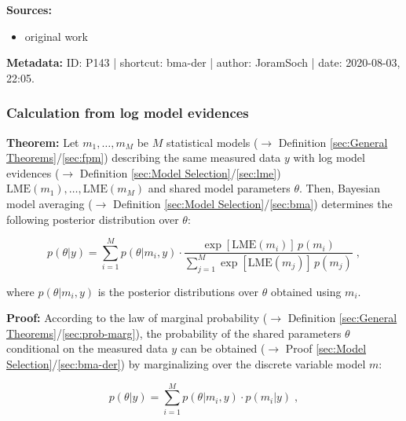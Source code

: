 \documentclass[a4paper,12pt,twoside]{book}
\begin{document}
\vspace{1em}
\textbf{Sources:}
\begin{itemize}
\item original work\end{itemize}


\vspace{1em}
\textbf{Metadata:} ID: P143 | shortcut: bma-der | author: JoramSoch | date: 2020-08-03, 22:05.
\vspace{1em}



\subsubsection[\textbf{Calculation from log model evidences}]{Calculation from log model evidences} \label{sec:bma-lme}
\setcounter{equation}{0}

\textbf{Theorem:} Let $m_1, \ldots, m_M$ be $M$ statistical models ($\rightarrow$ Definition \ref{sec:General Theorems}/\ref{sec:fpm}) describing the same measured data $y$ with log model evidences ($\rightarrow$ Definition \ref{sec:Model Selection}/\ref{sec:lme}) $\mathrm{LME}(m_1), \ldots, \mathrm{LME}(m_M)$ and shared model parameters $\theta$. Then, Bayesian model averaging ($\rightarrow$ Definition \ref{sec:Model Selection}/\ref{sec:bma}) determines the following posterior distribution over $\theta$:

\begin{equation} \label{eq:bma-lme-BMA-LME}
p(\theta|y) = \sum_{i=1}^{M} p(\theta|m_i,y) \cdot \frac{\exp[\mathrm{LME}(m_i)] \, p(m_i)}{\sum_{j=1}^{M} \exp[\mathrm{LME}(m_j)] \, p(m_j)} \; ,
\end{equation}

where $p(\theta \vert m_i,y)$ is the posterior distributions over $\theta$ obtained using $m_i$.


\vspace{1em}
\textbf{Proof:} According to the law of marginal probability ($\rightarrow$ Definition \ref{sec:General Theorems}/\ref{sec:prob-marg}), the probability of the shared parameters $\theta$ conditional on the measured data $y$ can be obtained ($\rightarrow$ Proof \ref{sec:Model Selection}/\ref{sec:bma-der}) by marginalizing over the discrete variable model $m$:

\begin{equation} \label{eq:bma-lme-BMA-PMP}
p(\theta|y) = \sum_{i=1}^{M} p(\theta|m_i,y) \cdot p(m_i|y) \; ,
\end{equation}
\end{document}
